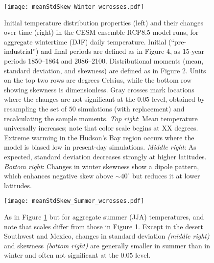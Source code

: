 \documentclass{ametsoc}
\newcommand\smallfigwidth{\columnwidth}
\begin{document}
\begin{figure}[ht]
\centerline{\texttt{[image: meanStdSkew\_Winter\_wcrosses.pdf]}}
\caption{\small{Initial temperature distribution properties (left) and their changes over time (right) in the CESM ensemble RCP8.5 model runs, for aggregate wintertime (DJF) daily temperature. Initial (``pre-industrial'') and final periods are defined as in Figure 4, as 15-year periods 1850--1864 and 2086--2100.  Distributional moments (mean, standard deviation, and skewness) are defined as in Figure 2. Units on the top two rows are degrees Celsius, while the bottom row showing skewness is dimensionless. Gray crosses mark locations where the changes are not significant at the $0.05$ level, obtained by resampling the set of $50$ simulations (with replacement) and recalculating the sample moments. \emph{Top right}: Mean temperature universally increases; note that color scale begins at XX degrees. Extreme warming in the Hudson's Bay region occurs where the model is biased low in present-day simulations. \emph{Middle right}: As expected, standard deviation decreases strongly at higher latitudes. \emph{Bottom right}: Changes in winter skewness show a dipole pattern, which enhances negative skew above $\sim 40 ^\circ$ but reduces it at lower latitudes. }}
\label{meanStdSkew_Winter}
\end{figure}

\begin{figure}[ht]
\centerline{\texttt{[image: meanStdSkew\_Summer\_wcrosses.pdf]}}
\caption{\small{As in Figure \ref{meanStdSkew_Winter} but for aggregate summer (JJA) temperatures, and note that scales differ from those in Figure \ref{meanStdSkew_Winter}. Except in the desert Southwest and Mexico, changes in standard deviation \emph{(middle right)} and skewness \emph{(bottom right)} are generally smaller in summer than in winter and often not significant at the $0.05$ level.}}
\label{meanStdSkew_Summer}
\end{figure}



\end{document}
